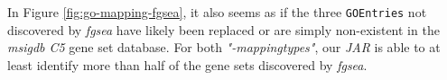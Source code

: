 \documentclass[12pt]{article}
\begin{document}
In Figure \ref{fig:go-mapping-fgsea}, it also seems as if the three \texttt{GOEntries} not discovered by 
\textit{fgsea} have likely been replaced or are simply non-existent in the \textit{msigdb C5}
gene set database. For both \textit{"-mappingtypes"}, our \textit{JAR} is able
to at least identify more than half of the gene sets discovered by \textit{fgsea}.






\newpage
\printbibliography
\end{document}
